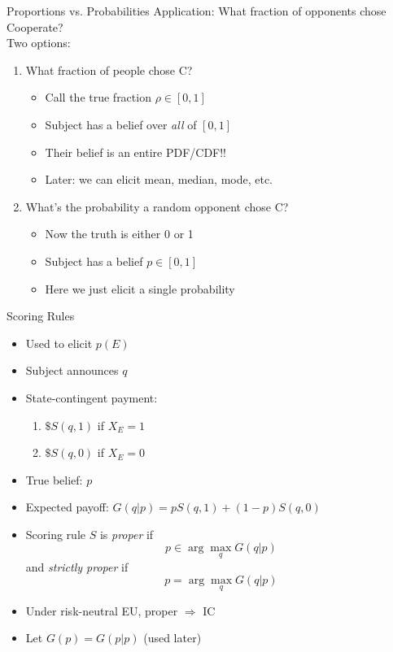 \begin{frame}{Proportions vs. Probabilities}
Application: What fraction of opponents chose Cooperate?\\
Two options:
\begin{enumerate}
    \item What fraction of people chose C?
    \begin{itemize}
        \item Call the true fraction $\rho\in [0,1]$
        \item Subject has a belief over \textit{all} of $[0,1]$
        \item Their belief is an entire PDF/CDF!!
        \item Later: we can elicit mean, median, mode, etc.
    \end{itemize}
    \item What's the probability a random opponent chose C?
    \begin{itemize}
        \item Now the truth is either 0 or 1
        \item Subject has a belief $p\in [0,1]$
        \item Here we just elicit a single probability
    \end{itemize}
    \end{enumerate}
\end{frame}

\begin{frame}{Scoring Rules}
\begin{itemize}
    \item Used to elicit $p(E)$
    \item Subject announces $q$
    \item State-contingent payment:
    \begin{enumerate}
        \item $\$S(q,1)$ if $X_E=1$
        \item $\$S(q,0)$ if $X_E=0$
    \end{enumerate}
    \item True belief: $p$
    \item Expected payoff: $G(q|p)=pS(q,1)+(1-p)S(q,0)$
    \item Scoring rule $S$ is \textit{proper} if
    $$
        p \in \arg\max_q G(q|p)
    $$
    and \textit{strictly proper} if
    $$
        p = \arg\max_q G(q|p)
    $$
    \item Under risk-neutral EU, proper $\Rightarrow$ IC
    \item Let $G(p)=G(p|p)$ (used later)
\end{itemize}
\end{frame}

